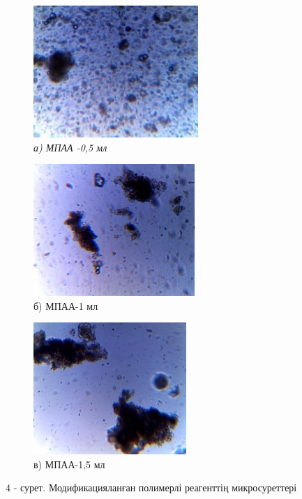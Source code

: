 \begin{figure}[H]
    \centering
    \begin{subfigure}[t]{0.3\textwidth}
        \centering
        \includegraphics[width=\textwidth, height=5cm]{media/gorn/image47}
        \caption*{\textit{а) МПАА -0,5 мл}}
    \end{subfigure}
    \begin{subfigure}[t]{0.3\textwidth}
        \centering
        \includegraphics[width=\textwidth, height=5cm]{media/gorn/image48}
        \caption*{б) МПАА-1 мл}
    \end{subfigure}
    \begin{subfigure}[t]{0.3\textwidth}
        \centering
        \includegraphics[width=\textwidth, height=5cm]{media/gorn/image49}
        \caption*{в) МПАА-1,5 мл}
    \end{subfigure}
    \caption*{4 - сурет. Модификацияланған полимерлі реагенттің микросуреттері}
\end{figure}

